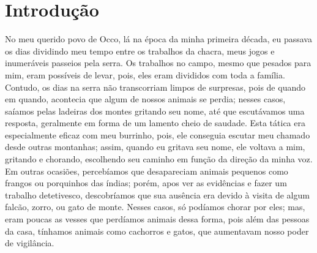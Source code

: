 \cleardoublepage
\newpage
{}
\chapter*{Introdução} %

No meu querido povo de Occo, lá na época da minha primeira década, eu passava os dias dividindo meu tempo entre os trabalhos da chacra, meus jogos e inumeráveis passeios pela serra.
Os trabalhos no campo, mesmo que pesados para mim, eram possíveis de levar, pois, eles eram divididos com toda a família.
Contudo, os dias na serra não transcorriam limpos de surpresas, pois de quando em quando, acontecia que algum de nossos animais se perdia; nesses casos, saíamos pelas ladeiras dos montes gritando seu nome, até que escutávamos uma resposta, geralmente em forma de um lamento cheio de saudade.
Esta tática era especialmente eficaz com meu burrinho, pois, ele conseguia escutar meu chamado desde outras montanhas; assim, quando eu gritava seu nome, ele voltava a mim, gritando e chorando, escolhendo seu caminho em função da direção da minha voz.
Em outras ocasiões, percebíamos que desapareciam animais pequenos como frangos ou porquinhos das índias; porém, apos ver as evidências e fazer um trabalho detetivesco, descobríamos que sua ausência era devido à visita de algum falcão, zorro, ou gato de monte.
Nesses casos, só podíamos chorar por eles; mas,  eram poucas as vesses que perdíamos animais dessa forma, pois além das pessoas da casa, tínhamos animais como cachorros e gatos, que aumentavam nosso poder de vigilância.

